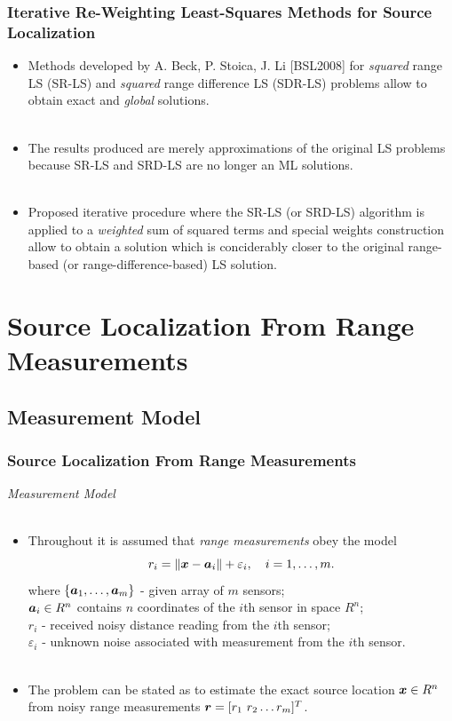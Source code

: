 \documentclass [t] {beamer} %
\begin{document}
\begin{frame} %
\frametitle{Iterative Re-Weighting Least-Squares Methods for Source
Localization}
\phantom{m}
\begin{itemize}
\item
Methods developed by A. Beck, P. Stoica, J. Li [BSL2008] for \textit{squared} range LS (SR-LS) and \textit{squared} range difference LS (SDR-LS) problems allow to obtain exact and \textit{global}  solutions.
\\~\\
\item
The results produced are merely approximations of the original LS
problems because SR-LS and SRD-LS are no longer an ML solutions.
\\~\\
\item
Proposed iterative procedure where the SR-LS (or SRD-LS) algorithm is applied to a \textit{weighted} sum of squared terms and special weights construction allow to obtain a solution which is conciderably closer to
the original range-based (or range-difference-based) LS solution.
\end{itemize}
\end{frame}




\section[Chapter 2]{Source Localization From Range Measurements}

\subsection{Measurement Model} %

\begin{frame} %
\frametitle{Source Localization From Range Measurements}
{\large \textit{Measurement Model}} \\~\\
\normalsize
\begin{itemize}
\item 
Throughout it is assumed that \textit{range measurements} obey the model
\begin{equation} 
\nonumber
r_i = \|{\mbox{\boldmath$x$}} - {\mbox{\boldmath$a$}}_i\| + \varepsilon_i, \quad i = 1, \ldots , m.
\end{equation}  
where $\{\mbox{\boldmath$a$}_1,\ldots, \mbox{\boldmath$a$}_m\}$ - given array of $m$ sensors;\\
$\mbox{\boldmath$a$}_i\in R^n$  contains $n$ coordinates of the $i$th sensor in space $R^n$; \\
$r_i$ - received noisy distance reading from the $i$th sensor; \\
$\varepsilon_i$ - unknown noise associated with measurement from the $i$th sensor. 
\\~\\
\item
The problem can be stated as to estimate the exact source location $\mbox{\boldmath$x$} \in R^n$ from noisy range measurements $\mbox{\boldmath$r$} = [r_1 \ r_2 \ldots r_m]^T$.
\end{itemize}
\end{frame}
\end{document}
